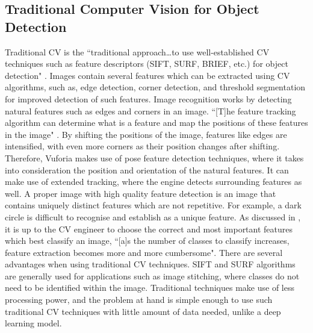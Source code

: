 \documentclass{aifyp}
\begin{document}
\subsection{Traditional Computer Vision for Object Detection}
Traditional CV is the “traditional approach…to use well-established CV techniques such as feature descriptors (SIFT, SURF, BRIEF, etc.) for object detection" \cite{ComputerVisVSDeep}. Images contain several features which can be extracted using CV algorithms, such as, edge detection, corner detection, and threshold segmentation for improved detection of such features. 
\newline
\newline
\indent Image recognition works by detecting natural features such as edges and corners in an image. “[T]he feature tracking algorithm can determine what is a feature and map the positions of these features in the image" \cite{VuforiaUnity}. By shifting the positions of the image, features like edges are intensified, with even more corners as their position changes after shifting. Therefore, Vuforia makes use of pose feature detection techniques, where it takes into consideration the position and orientation of the natural features. It can make use of extended tracking, where the engine detects surrounding features as well. A proper image with high quality feature detection is an image that contains uniquely distinct features which are not repetitive. For example, a dark circle is difficult to recognise and establish as a unique feature.
\newline
\newline
\indent As discussed in \cite{ComputerVisVSDeep}, it is up to the CV engineer to choose the correct and most important features which best classify an image, “[a]s the number of classes to classify increases, feature extraction becomes more and more cumbersome". 
There are several advantages when using traditional CV techniques. SIFT and SURF algorithms are generally used for applications such as image stitching, where classes do not need to be identified within the image. Traditional techniques make use of less processing power, and the problem at hand is simple enough to use such traditional CV techniques with little amount of data needed, unlike a deep learning model.
\end{document}
